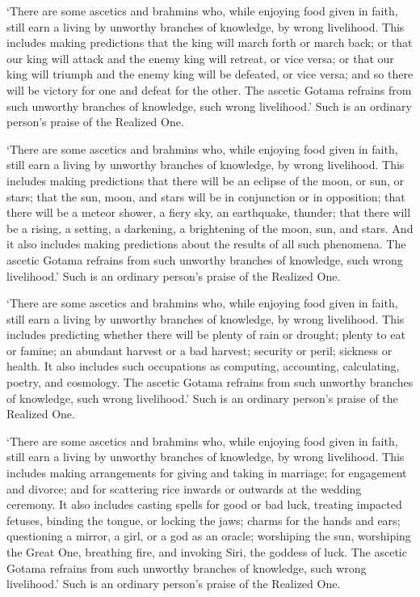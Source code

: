 \documentclass[12pt,openany]{book}%
\begin{document}
‘There are some ascetics and brahmins who, while enjoying food given in faith, still earn a living by unworthy branches of knowledge, by wrong livelihood. This includes making predictions that the king will march forth or march back; or that our king will attack and the enemy king will retreat, or vice versa; or that our king will triumph and the enemy king will be defeated, or vice versa; and so there will be victory for one and defeat for the other. The ascetic Gotama refrains from such unworthy branches of knowledge, such wrong livelihood.’ Such is an ordinary person’s praise of the Realized One. 

‘There are some ascetics and brahmins who, while enjoying food given in faith, still earn a living by unworthy branches of knowledge, by wrong livelihood. This includes making predictions that there will be an eclipse of the moon, or sun, or stars; that the sun, moon, and stars will be in conjunction or in opposition; that there will be a meteor shower, a fiery sky, an earthquake, thunder; that there will be a rising, a setting, a darkening, a brightening of the moon, sun, and stars. And it also includes making predictions about the results of all such phenomena. The ascetic Gotama refrains from such unworthy branches of knowledge, such wrong livelihood.’ Such is an ordinary person’s praise of the Realized One. 

‘There are some ascetics and brahmins who, while enjoying food given in faith, still earn a living by unworthy branches of knowledge, by wrong livelihood. This includes predicting whether there will be plenty of rain or drought; plenty to eat or famine; an abundant harvest or a bad harvest; security or peril; sickness or health. It also includes such occupations as computing, accounting, calculating, poetry, and cosmology. The ascetic Gotama refrains from such unworthy branches of knowledge, such wrong livelihood.’ Such is an ordinary person’s praise of the Realized One. 

‘There are some ascetics and brahmins who, while enjoying food given in faith, still earn a living by unworthy branches of knowledge, by wrong livelihood. This includes making arrangements for giving and taking in marriage; for engagement and divorce; and for scattering rice inwards or outwards at the wedding ceremony. It also includes casting spells for good or bad luck, treating impacted fetuses, binding the tongue, or locking the jaws; charms for the hands and ears; questioning a mirror, a girl, or a god as an oracle; worshiping the sun, worshiping the Great One, breathing fire, and invoking Siri, the goddess of luck. The ascetic Gotama refrains from such unworthy branches of knowledge, such wrong livelihood.’ Such is an ordinary person’s praise of the Realized One. 
\end{document}
